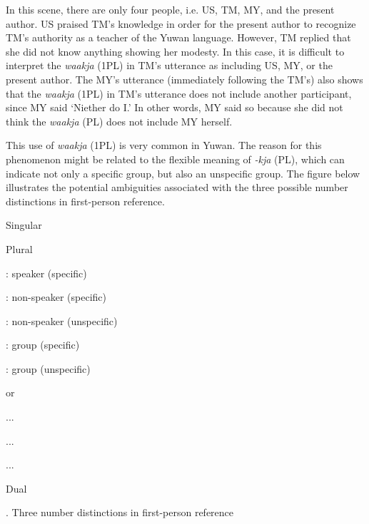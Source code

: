 In this scene, there are only four people, i.e. US, TM, MY, and the present author. US praised TM’s knowledge in order for the present author to recognize TM’s authority as a teacher of the Yuwan language. However, TM replied that she did not know anything showing her modesty. In this case, it is difficult to interpret the \textit{waakja} (1PL) in TM’s utterance as including US, MY, or the present author. The MY’s utterance (immediately following the TM’s) also shows that the \textit{waakja} (1PL) in TM’s utterance does not include another participant, since MY said ‘Niether do I.’ In other words, MY said so because she did not think the \textit{waakja} (PL) does not include MY herself.

  This use of \textit{waakja} (1PL) is very common in Yuwan. The reason for this phenomenon might be related to the flexible meaning of \textit{{}-kja} (PL), which can indicate not only a specific group, but also an unspecific group. The figure below illustrates the potential ambiguities associated with the three possible number distinctions in first-person reference.


Singular

Plural

: speaker (specific)

: non-speaker (specific)

: non-speaker (unspecific)

: group (specific)

: group (unspecific)

or

...

...

...

Dual

\begin{styleBeschriftung}
\textmd{. Three number distinctions in first-person reference}
\end{styleBeschriftung}

